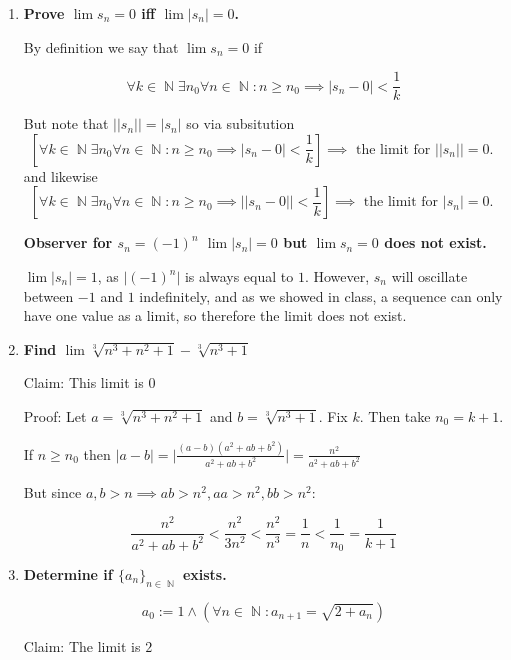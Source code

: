 \documentclass[10pt,a4paper]{article}
\DeclareMathOperator*{\N}{\mathbb{N}}
\begin{document}
\begin{enumerate}
    \item \textbf{Prove $\lim s_n = 0$ iff $\lim \lvert s_n \rvert = 0$.}

        By definition we say that $\lim s_n = 0$  if 

        $$\forall k \in \N \exists n_0 \forall n \in \N : n \geq n_0 \implies \lvert s_n - 0\rvert < \frac{1}{k}$$

        But note that $\lvert \lvert s_n \rvert \rvert  = \lvert s_n \rvert$ so via subsitution
        $$\left [ \forall k \in \N \exists n_0 \forall n \in \N : n \geq n_0 \implies \lvert s_n - 0\rvert < \frac{1}{k} \right ] \implies \text{ the limit for $\lvert \lvert s_n \rvert \rvert = 0$. } $$        
        and likewise
        $$\left [ \forall k \in \N \exists n_0 \forall n \in \N : n \geq n_0 \implies \lvert \lvert s_n - 0 \rvert \rvert < \frac{1}{k} \right ] \implies \text{ the limit for $\lvert s_n \rvert = 0$. } $$

        \textbf{Observer for $s_n = (-1)^n$ $\lim \lvert s_n \rvert = 0$ but $\lim s_n = 0$ does not exist.}

        $\lim \lvert s_n \rvert  = 1$, as $\lvert (-1) ^ n \rvert$ is always equal to $1$. However, $s_n$ will oscillate between $-1$ and $1$ indefinitely, and as we showed in class, a sequence can only have one value as a limit, so therefore the limit does not exist.

    \item \textbf{Find $\lim \sqrt[3]{n^3+n^2+1} - \sqrt[3]{n^3+1}$}

        Claim: This limit is 0

        Proof: Let $a = \sqrt[3]{n^3+n^2+1}$ and $b = \sqrt[3]{n^3+1}$. Fix $k$. Then take $n_0  = k+1$.

        If $n \geq n_0$ then $\lvert a-b \rvert = \lvert \frac {(a-b)(a^2+ab+b^2)}{a^2+ab+b^2} \rvert  = \frac{n^2}{a^2+ab+b^2} $
        
        But since $a,b> n \implies ab > n^2, aa> n^2, bb > n^2$:
        
        $$\frac{n^2}{a^2+ab+b^2} < \frac{n^2}{3n^2} < \frac{n^2}{n^3} = \frac{1}{n} < \frac{1}{n_0} = \frac{1}{k+1}$$

    \item \textbf{Determine if $\{a_n\}_{n \in \N}$ exists.}

        $$ a_0 := 1 \land \left ( \forall n \in \N: a_{n+1} = \sqrt{2+a_n}\right)$$

        Claim: The limit is $2$


\end{enumerate}
\end{document}
